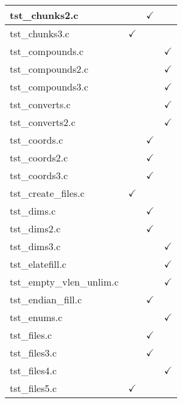 \begin{table}[H]
\begin{tabular}{|l|c|c|c|}
tst\_chunks2.c          &               & $\checkmark$  &               \\ \hline
tst\_chunks3.c          & $\checkmark$  &               &               \\ \hline
tst\_compounds.c        &               &               & $\checkmark$  \\ \hline
tst\_compounds2.c       &               &               & $\checkmark$  \\ \hline
tst\_compounds3.c       &               &               & $\checkmark$  \\ \hline
tst\_converts.c         &               &               & $\checkmark$  \\ \hline
tst\_converts2.c        &               &               & $\checkmark$  \\ \hline
tst\_coords.c           &               & $\checkmark$  &               \\ \hline
tst\_coords2.c          &               & $\checkmark$  &               \\ \hline
tst\_coords3.c          &               & $\checkmark$  &               \\ \hline
tst\_create\_files.c    & $\checkmark$  &               &               \\ \hline
tst\_dims.c             &               & $\checkmark$  &               \\ \hline
tst\_dims2.c            &               & $\checkmark$  &               \\ \hline
tst\_dims3.c            &               &               & $\checkmark$  \\ \hline
tst\_elatefill.c        &               &               & $\checkmark$  \\ \hline
tst\_empty\_vlen\_unlim.c   &           &               & $\checkmark$  \\ \hline
tst\_endian\_fill.c     &               & $\checkmark$  &               \\ \hline
tst\_enums.c            &               &               & $\checkmark$  \\ \hline
tst\_files.c            &               & $\checkmark$  &               \\ \hline
tst\_files3.c           &               & $\checkmark$  &               \\ \hline
tst\_files4.c           &               &               & $\checkmark$  \\ \hline
tst\_files5.c           & $\checkmark$  &               &               \\ \hline

\end{tabular}
\end{table}
